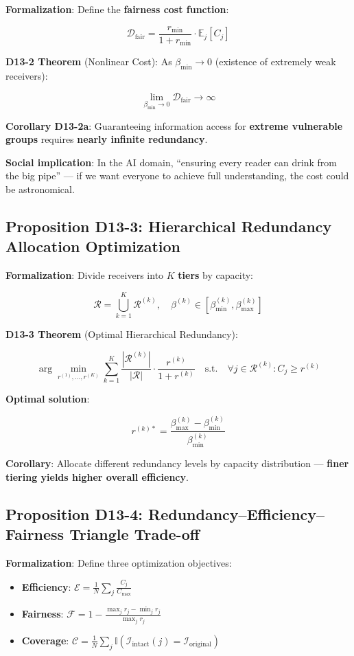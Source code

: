 \documentclass[12pt,a4paper]{article}
\newcommand{\calR}{\mathcal{R}}
\newcommand{\calF}{\mathcal{F}}
\newcommand{\calE}{\mathcal{E}}
\newcommand{\calC}{\mathcal{C}}
\newcommand{\calInt}{\mathcal{I}_{\text{intact}}}
\newcommand{\calOrig}{\mathcal{I}_{\text{original}}}
\newcommand{\calCmax}{C_{\max}}
\newcommand{\calDfair}{\mathcal{D}_{\text{fair}}}
\newcommand{\betamin}{\beta_{\min}}
\newcommand{\betamink}{\beta_{\min}^{(k)}}
\newcommand{\betamxk}{\beta_{\max}^{(k)}}
\newcommand{\betak}{\beta^{(k)}}
\newcommand{\RcalK}{\mathcal{R}^{(k)}}
\begin{document}
\textbf{Formalization}: Define the \textbf{fairness cost function}:

$$\calDfair = \frac{r_{\min}}{1 + r_{\min}} \cdot \mathbb{E}_{j}[C_j]$$

\textbf{D13-2 Theorem} (Nonlinear Cost): As $\betamin \to 0$ (existence of extremely weak receivers):

$$\lim_{\betamin \to 0} \calDfair \to \infty$$

\textbf{Corollary D13-2a}: Guaranteeing information access for \textbf{extreme vulnerable groups} requires \textbf{nearly infinite redundancy}.

\textbf{Social implication}: In the AI domain, ``ensuring every reader can drink from the big pipe'' --- if we want everyone to achieve full understanding, the cost could be astronomical.

\subsection{Proposition D13-3: Hierarchical Redundancy Allocation Optimization}

\textbf{Formalization}: Divide receivers into $K$ \textbf{tiers} by capacity:

$$\calR = \bigcup_{k=1}^{K} \RcalK, \quad \betak \in [\betamink, \betamxk]$$

\textbf{D13-3 Theorem} (Optimal Hierarchical Redundancy):

$$\arg\min_{r^{(1)}, \ldots, r^{(K)}} \sum_{k=1}^{K} \frac{|\RcalK|}{|\calR|} \cdot \frac{r^{(k)}}{1 + r^{(k)}} \quad \text{s.t.} \quad \forall j \in \RcalK: C_j \geq r^{(k)}$$

\textbf{Optimal solution}:

$$r^{(k)*} = \frac{\betamxk - \betamink}{\betamink}$$

\textbf{Corollary}: Allocate different redundancy levels by capacity distribution --- \textbf{finer tiering yields higher overall efficiency}.

\subsection{Proposition D13-4: Redundancy--Efficiency--Fairness Triangle Trade-off}

\textbf{Formalization}: Define three optimization objectives:
\begin{itemize}
    \item \textbf{Efficiency}: $\calE = \frac{1}{N} \sum_j \frac{C_j}{\calCmax}$
    \item \textbf{Fairness}: $\calF = 1 - \frac{\max_j r_j - \min_j r_j}{\max_j r_j}$
    \item \textbf{Coverage}: $\calC = \frac{1}{N} \sum_j \mathbb{I}(\calInt(j) = \calOrig)$
\end{itemize}
\end{document}
